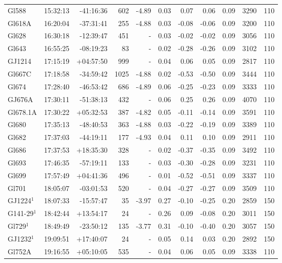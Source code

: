 \documentclass[referee]{aa}
\begin{document}
{\begin{longtable}{l r r r r r r r r r r}
Gl588 & 15:32:13 & -41:16:36 & 602 & -4.89 & 0.03 & 0.07 & 0.06 & 0.09 & 3290 &  110 \\
Gl618A & 16:20:04 & -37:31:41 & 255 & -4.88 & 0.03 & -0.08 & -0.06 & 0.09 & 3200 &  110 \\
Gl628 & 16:30:18 & -12:39:47 & 451 &    - & 0.03 & -0.02 & -0.02 & 0.09 & 3056 &  110 \\
Gl643 & 16:55:25 & -08:19:23 & 83 &    - & 0.02 & -0.28 & -0.26 & 0.09 & 3102 &  110 \\
GJ1214 & 17:15:19 & +04:57:50 & 999 &    - & 0.04 & 0.06 & 0.05 & 0.09 & 2817 &  110 \\
Gl667C & 17:18:58 & -34:59:42 & 1025 & -4.88 & 0.02 & -0.53 & -0.50 & 0.09 & 3444 &  110 \\
Gl674 & 17:28:40 & -46:53:42 & 686 & -4.89 & 0.06 & -0.25 & -0.23 & 0.09 & 3333 &  110 \\
GJ676A & 17:30:11 & -51:38:13 & 432 &    - & 0.06 & 0.25 & 0.26 & 0.09 & 4070 &  110 \\
Gl678.1A & 17:30:22 & +05:32:53 & 387 & -4.82 & 0.05 & -0.11 & -0.14 & 0.09 & 3591 &  110 \\
Gl680 & 17:35:13 & -48:40:53 & 363 & -4.88 & 0.03 & -0.22 & -0.19 & 0.09 & 3389 &  110 \\
Gl682 & 17:37:03 & -44:19:11 & 177 & -4.93 & 0.04 & 0.11 & 0.10 & 0.09 & 2911 &  110 \\
Gl686 & 17:37:53 & +18:35:30 & 328 &    - & 0.02 & -0.37 & -0.35 & 0.09 & 3492 &  110 \\
Gl693 & 17:46:35 & -57:19:11 & 133 &    - & 0.03 & -0.30 & -0.28 & 0.09 & 3231 &  110 \\
Gl699 & 17:57:49 & +04:41:36 & 496 &    - & 0.01 & -0.52 & -0.51 & 0.09 & 3337 &  110 \\
Gl701 & 18:05:07 & -03:01:53 & 520 &    - & 0.04 & -0.27 & -0.27 & 0.09 & 3509 &  110 \\
GJ1224$^1$ & 18:07:33 & -15:57:47 & 35 & -3.97 & 0.27 & -0.10 & -0.25 & 0.20 & 2859 &  150 \\
G141-29$^1$ & 18:42:44 & +13:54:17 & 24 &    - & 0.26 & 0.09 & -0.08 & 0.20 & 3011 &  150 \\
Gl729$^1$ & 18:49:49 & -23:50:12 & 135 & -3.77 & 0.31 & -0.10 & -0.40 & 0.20 & 3057 &  150 \\
GJ1232$^1$ & 19:09:51 & +17:40:07 & 24 &    - & 0.05 & 0.14 & 0.03 & 0.20 & 2892 &  150 \\
Gl752A & 19:16:55 & +05:10:05 & 535 &    - & 0.04 & 0.06 & 0.05 & 0.09 & 3338 &  110 \\

\end{longtable}}
\end{document}
